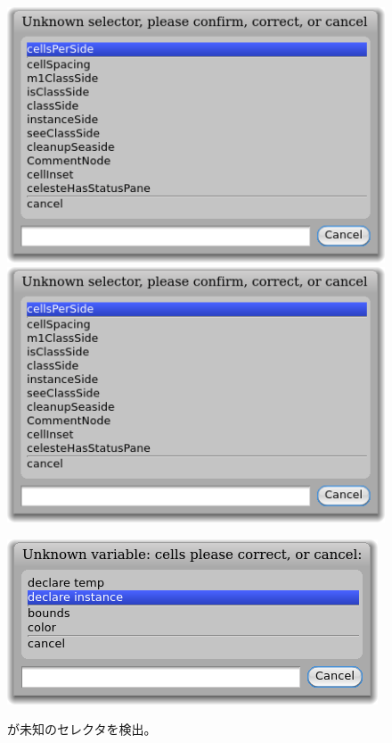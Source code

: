 \documentclass[a4paper,10pt,twoside]{book}
\begin{document}
\begin{figure}[htb]
\begin{minipage}{0.48\textwidth}
	\centering
	\ifluluelse
		{\includegraphics[width=\textwidth]{UnknownSelector}}
		{\includegraphics[scale=0.7]{UnknownSelector}}
	\caption{\pharo が未知のセレクタを検出。}
\end{minipage}
\hfill
\begin{minipage}{0.48\textwidth}
	\centering
	\ifluluelse
		{\includegraphics[width=\textwidth]{DeclareInstanceVar}}

\end{minipage}
\end{figure}
\end{document}
